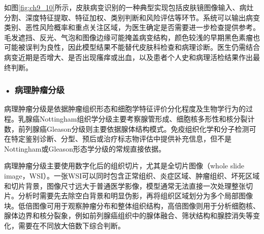 如图\ref{fig:ch9_10}所示，皮肤病变识别的一种典型实现包括皮肤镜图像输入、病灶分割、深度特征提取、特征加权、类别判断和风险评估等环节。系统可以输出病变类别、恶性风险概率和重点关注区域，为医生确定是否需要进一步检查提供参考。毛发遮挡、反光、气泡和图像边缘可能掩盖病变结构，颜色较浅的早期黑色素瘤也可能被误判为良性，因此模型结果不能替代皮肤科检查和病理诊断。医生仍需结合病变近期是否增大、是否出现瘙痒或出血，以及患者个人史和病理活检结果作出最终判断。

\par
\noindent\begin{minipage}{\textwidth}
\centering
{}
\label{fig:ch9_10}
\end{minipage}
\par

\subsubsection*{\textbf{• 病理肿瘤分级}}

病理肿瘤分级是依据肿瘤组织形态和细胞学特征评价分化程度及生物学行为的过程。乳腺癌Nottingham组织学分级主要考察腺管形成、细胞核多形性和核分裂计数，前列腺癌Gleason分级则主要依据腺体结构模式。免疫组织化学和分子检测可在特定鉴别诊断、分型、预后或治疗标志物评估中提供补充信息，但不是Nottingham或Gleason形态学分级的常规直接依据。

病理肿瘤分级主要使用数字化后的组织切片，尤其是全切片图像（whole slide image，WSI）。一张WSI可以同时包含正常组织、炎症区域、肿瘤组织、坏死区域和切片背景，图像尺寸远大于普通医学影像，模型通常无法直接一次处理整张切片。分析时需要先去除空白背景和明显伪影，再将组织区域划分为多个局部图像块。低倍图像可用于观察肿瘤分布和整体组织结构，高倍图像则用于分析细胞核、腺体边界和核分裂象，例如前列腺癌组织中的腺体融合、筛状结构和腺腔消失等变化，需要在不同放大倍数下综合判断。

